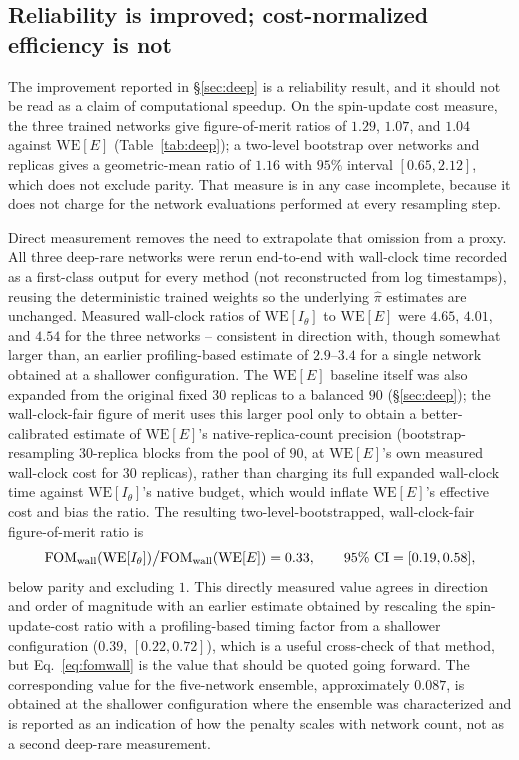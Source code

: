\documentclass[a4paper,fleqn]{cas-sc}
\newcommand{\WE}{\mathrm{WE}}
\newcommand{\FOM}{\mathrm{FOM}}
\begin{document}
\subsection{Reliability is improved; cost-normalized efficiency is not}\label{sec:costdisc}
The improvement reported in \S\ref{sec:deep} is a reliability result, and it should not be read
as a claim of computational speedup. On the spin-update cost measure, the three trained networks
give figure-of-merit ratios of $1.29$, $1.07$, and $1.04$ against $\WE[E]$
(Table~\ref{tab:deep}); a two-level bootstrap over networks and replicas gives a geometric-mean
ratio of $1.16$ with $95\%$ interval $[0.65,2.12]$, which does not exclude parity. That measure
is in any case incomplete, because it does not charge for the network evaluations performed at
every resampling step.

Direct measurement removes the need to extrapolate that omission from a proxy. All three deep-rare
networks were rerun end-to-end with wall-clock time recorded as a first-class output for every
method (not reconstructed from log timestamps), reusing the deterministic trained weights so the
underlying $\hat\pi$ estimates are unchanged. Measured wall-clock ratios of $\WE[I_\theta]$ to
$\WE[E]$ were $4.65$, $4.01$, and $4.54$ for the three networks -- consistent in direction with,
though somewhat larger than, an earlier profiling-based estimate of $2.9$--$3.4$ for a single
network obtained at a shallower configuration. The $\WE[E]$ baseline itself was also expanded
from the original fixed $30$ replicas to a balanced $90$ (\S\ref{sec:deep}); the wall-clock-fair
figure of merit uses this larger pool only to obtain a better-calibrated estimate of $\WE[E]$'s
native-replica-count precision (bootstrap-resampling $30$-replica blocks from the pool of $90$,
at $\WE[E]$'s own measured wall-clock cost for $30$ replicas), rather than charging its full
expanded wall-clock time against $\WE[I_\theta]$'s native budget, which would inflate $\WE[E]$'s
effective cost and bias the ratio. The resulting two-level-bootstrapped, wall-clock-fair
figure-of-merit ratio is
\begin{equation}
\FOM_{\rm wall}(\WE[I_\theta])\big/\FOM_{\rm wall}(\WE[E]) = 0.33,
\qquad 95\%\ \mathrm{CI}=[0.19,0.58],
\label{eq:fomwall}
\end{equation}
below parity and excluding $1$. This directly measured value agrees in direction and order of
magnitude with an earlier estimate obtained by rescaling the spin-update-cost ratio with a
profiling-based timing factor from a shallower configuration ($0.39$, $[0.22,0.72]$), which is a
useful cross-check of that method, but Eq.~\eqref{eq:fomwall} is the value that should be quoted
going forward. The corresponding value for the five-network ensemble, approximately $0.087$, is
obtained at the shallower configuration where the ensemble was characterized and is reported as
an indication of how the penalty scales with network count, not as a second deep-rare
measurement.
\end{document}
